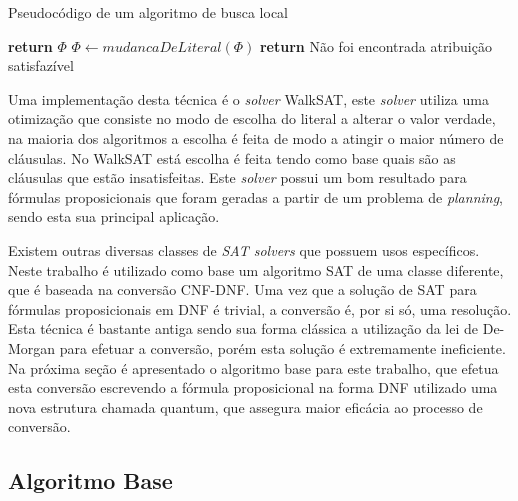 \documentclass{ufsc-thesis}
\begin{document}
\begin{algorithm}
\caption{Pseudocódigo de um algoritmo de busca local} \label{alg:local}
\begin{algorithmic}[1]
     
            \State \textbf{return} $\Phi$
        \EndIf
        \State $\Phi \gets mudancaDeLiteral(\Phi)$ 
    \EndFor
\EndFor
\State \textbf{return} Não foi encontrada atribuição satisfazível
\EndProcedure
\end{algorithmic}
\end{algorithm}

Uma implementação desta técnica é o \textit{solver} WalkSAT\cite{Selman95}, 
este \textit{solver} utiliza uma otimização que consiste no modo de escolha 
do literal a alterar o valor verdade, na maioria dos algoritmos 
a escolha é feita de modo a atingir o maior número de cláusulas. No 
WalkSAT está escolha é feita tendo como base quais são as cláusulas que 
estão insatisfeitas. Este \textit{solver} possui um bom resultado 
para fórmulas proposicionais que foram geradas a partir de um problema 
de \textit{planning}, sendo esta sua principal aplicação\cite{Kautz1996}.

Existem outras diversas classes de \textit{SAT solvers} que possuem 
usos específicos. Neste trabalho é utilizado como base um algoritmo 
SAT de uma classe diferente, que é baseada na conversão CNF-DNF. 
Uma vez que a solução de SAT para fórmulas proposicionais em DNF é 
trivial, a conversão é, por si só, uma resolução. Esta técnica é bastante 
antiga sendo sua forma clássica a utilização da lei de De-Morgan para efetuar 
a conversão\cite{Skiena2008}, porém esta solução é extremamente ineficiente\cite{Miltersen2005}. 
Na próxima seção é apresentado o algoritmo base para este trabalho, que 
efetua esta conversão escrevendo a fórmula proposicional na forma DNF 
utilizado uma nova estrutura chamada quantum, que assegura maior eficácia 
ao processo de conversão.

\subsection{Algoritmo Base}
\label{sec:algbase}

\end{document}
